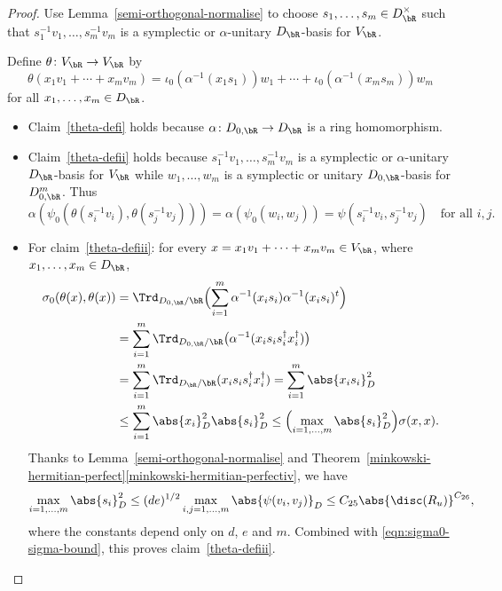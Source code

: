 \begin{proof}
Use Lemma~\ref{semi-orthogonal-normalise} to choose $s_1, \dotsc, s_m \in D_\bR^\times$ such that $s_1^{-1} v_1, \dotsc, s_m^{-1} v_m$ is a symplectic or $\alpha$-unitary $D_\bR$-basis for $V_\bR$.

Define $\theta \colon V_\bR \to V_\bR$ by
\[
\theta(x_1v_1 + \dotsb + x_mv_m) = \iota_0(\alpha^{-1}(x_1 s_1))w_1 + \dotsb + \iota_0(\alpha^{-1}(x_m s_m))w_m
\]
for all $x_1, \dotsc, x_m \in D_\bR$.

\begin{itemize}
\item
Claim~\eqref{theta-defi} holds because $\alpha \colon D_{0,\bR} \to D_\bR$ is a ring homomorphism.

\item
Claim~\eqref{theta-defii} holds because $s_1^{-1} v_1, \dotsc, s_m^{-1} v_m$ is a symplectic or $\alpha$-unitary $D_\bR$-basis for $V_\bR$ while $w_1, \dotsc, w_m$ is a symplectic or unitary $D_{0,\bR}$-basis for $D_{0,\bR}^m$.
Thus
\[
\alpha(\psi_0(\theta(s_i^{-1} v_i), \theta(s_j^{-1} v_j))) = \alpha(\psi_0(w_i, w_j)) = \psi(s_i^{-1} v_i, s_j^{-1} v_j) \quad\text{for all } i, j.
\]

\item
For claim~\eqref{theta-defiii}: for every $x = x_1v_1 + \dotsb + x_mv_m \in V_\bR$, where $x_1, \dotsc, x_m \in D_\bR$,
\begin{equation}\label{eqn:sigma0-sigma-bound}
\begin{aligned}
\sigma_0(\theta(x), \theta(x))
& = \Trd_{D_{0,\bR}/\bR} \Bigl( \sum_{i=1}^m \alpha^{-1}(x_is_i) \alpha^{-1}(x_is_i)^t \Bigr)
\\& = \sum_{i=1}^m \Trd_{D_{0,\bR}/\bR} \bigl( \alpha^{-1}(x_is_i s_i^\dag x_i^\dag) \bigr)
\\& = \sum_{i=1}^m \Trd_{D_\bR/\bR}(x_is_i s_i^\dag x_i^\dag)
= \sum_{i=1}^m \abs{x_is_i}_D^2
\\& \leq \sum_{i=1}^m \abs{x_i}_D^2 \abs{s_i}_D^2
\leq \Bigl( \max_{i=1,\dotsc,m} \abs{s_i}_D^2 \Bigr) \sigma(x, x).
\end{aligned}
\end{equation}
Thanks to Lemma~\ref{semi-orthogonal-normalise} and Theorem~\ref{minkowski-hermitian-perfect}\eqref{minkowski-hermitian-perfectiv}, we have
\[
\max_{i=1, \dotsc, m} \abs{s_i}_D^2
\leq (de)^{1/2} \max_{i,j = 1, \dotsc, m} \abs{\psi(v_i, v_j)}_D
\leq C_{25} \abs{\disc(R_u)}^{C_{26}},
\]
where the constants depend only on $d$, $e$ and $m$.
Combined with \eqref{eqn:sigma0-sigma-bound}, this proves claim~\eqref{theta-defiii}.\qedhere
\end{itemize}
\end{proof}

